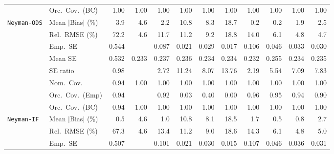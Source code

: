 \begin{landscape}
\begin{longtable}{llrrrrrrrrrr}
 & Orc.\ Cov.\ (BC) & \cellcolor{rankone}1.00 & \cellcolor{rankone}1.00 & \cellcolor{rankone}1.00 & \cellcolor{rankone}1.00 & \cellcolor{rankone}1.00 & \cellcolor{rankone}1.00 & \cellcolor{rankone}1.00 & \cellcolor{rankone}1.00 & \cellcolor{rankone}1.00 & \cellcolor{rankone}1.00 \\
\addlinespace[2pt]
\quad \texttt{Neyman-ODS} & Mean $|$Bias$|$ (\%) & 3.9 & 4.6 & \cellcolor{rankthree}2.2 & 10.8 & 8.3 & 18.7 & \cellcolor{rankone}0.2 & \cellcolor{rankone}0.2 & \cellcolor{ranktwo}1.9 & 2.5 \\
 & Rel.\ RMSE (\%) & 72.2 & \cellcolor{rankone}4.6 & 11.7 & 11.2 & 9.2 & 18.8 & 14.0 & 6.1 & \cellcolor{rankthree}4.8 & \cellcolor{ranktwo}4.7 \\
 & Emp.\ SE & 0.544 &  & 0.087 & 0.021 & 0.029 & 0.017 & 0.106 & 0.046 & 0.033 & 0.030 \\
 & Mean SE & 0.532 & 0.233 & 0.237 & 0.236 & 0.234 & 0.234 & 0.232 & 0.255 & 0.234 & 0.235 \\
 & SE ratio & \cellcolor{rankone}0.98 &  & \cellcolor{rankthree}2.72 & 11.24 & 8.07 & 13.76 & \cellcolor{ranktwo}2.19 & 5.54 & 7.09 & 7.83 \\
 & Nom.\ Cov. & \cellcolor{rankone}0.94 & \cellcolor{ranktwo}1.00 & \cellcolor{ranktwo}1.00 & \cellcolor{ranktwo}1.00 & \cellcolor{ranktwo}1.00 & \cellcolor{ranktwo}1.00 & \cellcolor{ranktwo}1.00 & \cellcolor{ranktwo}1.00 & \cellcolor{ranktwo}1.00 & \cellcolor{ranktwo}1.00 \\
 & Orc.\ Cov.\ (Emp) & \cellcolor{ranktwo}0.94 &  & \cellcolor{rankthree}0.92 & 0.03 & 0.40 & 0.00 & \cellcolor{ranktwo}0.96 & \cellcolor{rankone}0.95 & \cellcolor{ranktwo}0.94 & 0.90 \\
 & Orc.\ Cov.\ (BC) & \cellcolor{rankone}0.94 & \cellcolor{ranktwo}1.00 & \cellcolor{ranktwo}1.00 & \cellcolor{ranktwo}1.00 & \cellcolor{ranktwo}1.00 & \cellcolor{ranktwo}1.00 & \cellcolor{ranktwo}1.00 & \cellcolor{ranktwo}1.00 & \cellcolor{ranktwo}1.00 & \cellcolor{ranktwo}1.00 \\
\addlinespace[2pt]
\quad \texttt{Neyman-IF} & Mean $|$Bias$|$ (\%) & \cellcolor{rankone}0.5 & 4.6 & \cellcolor{rankthree}1.0 & 10.8 & 8.1 & 18.5 & 1.7 & \cellcolor{rankone}0.5 & \cellcolor{ranktwo}0.8 & 2.7 \\
 & Rel.\ RMSE (\%) & 67.3 & \cellcolor{rankone}4.6 & 13.4 & 11.2 & 9.0 & 18.6 & 14.3 & 6.1 & \cellcolor{ranktwo}4.8 & \cellcolor{rankthree}5.0 \\
 & Emp.\ SE & 0.507 &  & 0.101 & 0.021 & 0.030 & 0.015 & 0.107 & 0.046 & 0.036 & 0.031 \\

\end{longtable}
\end{landscape}
